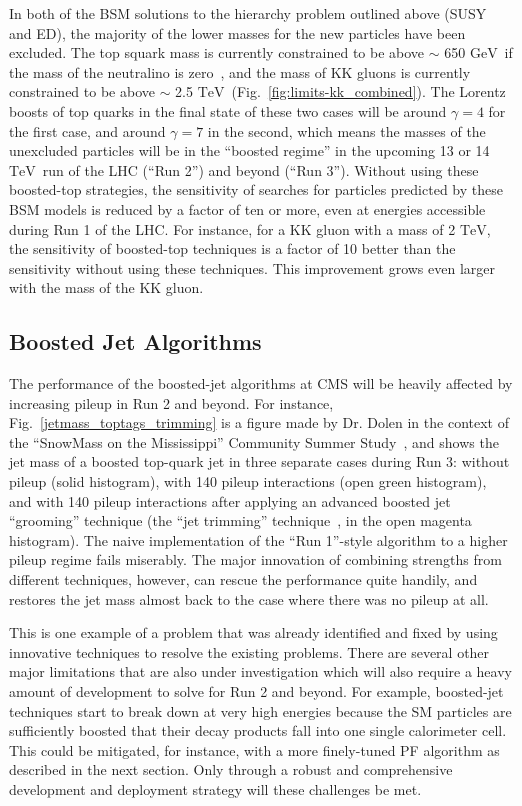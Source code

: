 \documentclass[12pt]{proposalnsf}
\newcommand{\TeV}{\ensuremath{\mathrm{TeV}}}
\newcommand{\GeVcc}{\ensuremath{\mathrm{GeV}}}
\newcommand{\TeVcc}{\ensuremath{\mathrm{TeV}}}
\begin{document}
In both of the BSM solutions to the hierarchy problem outlined above
(SUSY and ED), the majority of the
lower masses for the new particles have been excluded. The top squark
mass is currently
constrained to be above $\sim$ 650 \GeVcc\ if the mass of the
neutralino is zero~\cite{SUS-13-011}, and the mass of
KK gluons is currently constrained to be
above $\sim$ 2.5 \TeVcc\ (Fig.~\ref{fig:limits-kk_combined}).
The Lorentz boosts of top quarks in the final state of these two cases
will be around $\gamma=4$ for the first case, and around $\gamma=7$ in
the second, which means the masses of the unexcluded particles will be
in the ``boosted regime'' in the upcoming 13 or 14 \TeV\ run of the
LHC (``Run 2'') and beyond (``Run 3''). Without using these
boosted-top strategies, the
sensitivity of searches for particles predicted by these BSM models is
reduced by a factor of ten or more, even at energies accessible during
Run 1 of the LHC. For instance, for a KK gluon with a mass of 2
\TeVcc, the sensitivity of boosted-top techniques is a factor of 10
better than the sensitivity without using these techniques. This
improvement grows even larger with the mass of the KK gluon. 


\subsection{Boosted Jet Algorithms}

The performance of the boosted-jet algorithms at CMS will be heavily
affected by increasing pileup in Run 2 and beyond. For instance,
Fig.~\ref{jetmass_toptags_trimming} is a figure made by Dr. Dolen in
the context of the ``SnowMass on the Mississippi'' Community Summer
Study~\cite{snowmass}, and shows the jet
mass of a boosted top-quark jet in three separate cases during Run 3: 
without pileup (solid histogram), with 140 pileup
interactions (open green histogram), and with 140 pileup
interactions after applying an advanced boosted jet ``grooming''
technique (the ``jet trimming'' technique~\cite{trimming}, in the open
magenta
histogram). The naive implementation of the
``Run 1''-style
algorithm to a higher pileup regime fails miserably. The major
innovation of combining strengths from different techniques, however,
can rescue the performance quite handily, and restores the jet mass
almost back to the case where there was no pileup at all. 

This is one example of a problem that was already identified and fixed
by using innovative techniques to resolve the existing problems. There
are several other major limitations that are also under investigation
which will also require a heavy amount of development to solve for Run
2 and beyond. For example, boosted-jet techniques start to break down
at very high energies because the SM particles are sufficiently
boosted that their decay products fall into one single calorimeter
cell. This could be mitigated, for instance, with a more finely-tuned
PF algorithm as described in the next section. Only through a robust
and comprehensive development and deployment strategy will these
challenges be met. 
\end{document}
